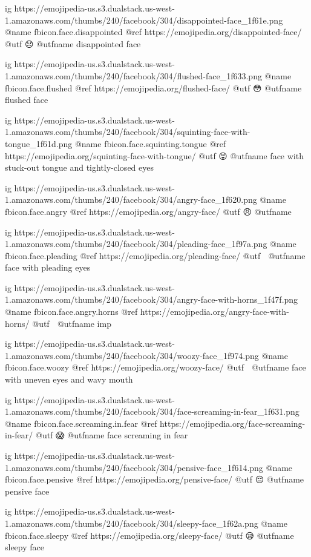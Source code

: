 	ig https://emojipedia-us.s3.dualstack.us-west-1.amazonaws.com/thumbs/240/facebook/304/disappointed-face_1f61e.png
	@name fbicon.face.disappointed
	@ref https://emojipedia.org/disappointed-face/
	@utf 😞
	@utfname disappointed face

	ig https://emojipedia-us.s3.dualstack.us-west-1.amazonaws.com/thumbs/240/facebook/304/flushed-face_1f633.png
	@name fbicon.face.flushed
	@ref https://emojipedia.org/flushed-face/
	@utf 😳
	@utfname flushed face

	ig https://emojipedia-us.s3.dualstack.us-west-1.amazonaws.com/thumbs/240/facebook/304/squinting-face-with-tongue_1f61d.png
	@name fbicon.face.squinting.tongue
	@ref https://emojipedia.org/squinting-face-with-tongue/
	@utf 😝
	@utfname face with stuck-out tongue and tightly-closed eyes

	ig https://emojipedia-us.s3.dualstack.us-west-1.amazonaws.com/thumbs/240/facebook/304/angry-face_1f620.png
	@name fbicon.face.angry
	@ref https://emojipedia.org/angry-face/
	@utf 😠
	@utfname

	ig https://emojipedia-us.s3.dualstack.us-west-1.amazonaws.com/thumbs/240/facebook/304/pleading-face_1f97a.png
	@name fbicon.face.pleading
	@ref https://emojipedia.org/pleading-face/
	@utf 🥺
	@utfname face with pleading eyes

	ig https://emojipedia-us.s3.dualstack.us-west-1.amazonaws.com/thumbs/240/facebook/304/angry-face-with-horns_1f47f.png
	@name fbicon.face.angry.horns
	@ref https://emojipedia.org/angry-face-with-horns/
	@utf 👿
	@utfname imp

	ig https://emojipedia-us.s3.dualstack.us-west-1.amazonaws.com/thumbs/240/facebook/304/woozy-face_1f974.png
	@name fbicon.face.woozy
	@ref https://emojipedia.org/woozy-face/
	@utf 🥴
	@utfname face with uneven eyes and wavy mouth

	ig https://emojipedia-us.s3.dualstack.us-west-1.amazonaws.com/thumbs/240/facebook/304/face-screaming-in-fear_1f631.png
	@name fbicon.face.screaming.in.fear
	@ref https://emojipedia.org/face-screaming-in-fear/
	@utf 😱
	@utfname face screaming in fear

	ig https://emojipedia-us.s3.dualstack.us-west-1.amazonaws.com/thumbs/240/facebook/304/pensive-face_1f614.png
	@name fbicon.face.pensive
	@ref https://emojipedia.org/pensive-face/
	@utf 😔
	@utfname pensive face

	ig https://emojipedia-us.s3.dualstack.us-west-1.amazonaws.com/thumbs/240/facebook/304/sleepy-face_1f62a.png
	@name fbicon.face.sleepy
	@ref https://emojipedia.org/sleepy-face/
	@utf 😪
	@utfname sleepy face

